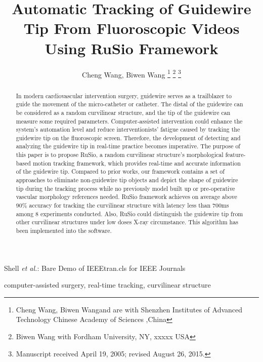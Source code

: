 \documentclass[journal]{IEEEtran}
\begin{document}
\title{Automatic Tracking of Guidewire Tip From Fluoroscopic Videos Using RuSio Framework}


\author{Cheng Wang, Biwen Wang
\thanks{Cheng Wang, Biwen Wangand are with Shenzhen Institutes of Advanced Technology Chinese Academy of Sciences ,China}
\thanks{Biwen Wang with Fordham University, NY, xxxxx USA}
\thanks{Manuscript received April 19, 2005; revised August 26, 2015.}}


{Shell \MakeLowercase{\textit{et al.}}: Bare Demo of IEEEtran.cls for IEEE Journals}


\maketitle


\begin{abstract}
In modern cardiovascular intervention surgery, guidewire serves as a trailblazer to guide the movement of the micro-catheter or catheter. The distal of the guidewire can be considered as a random curvilinear structure, and the tip of the guidewire can measure some required parameters. Computer-assisted intervention could enhance the system's automation level and reduce interventionists' fatigue caused by tracking the guidewire tip on the fluoroscopic screen. Therefore, the development of detecting and analyzing the guidewire tip in real-time practice becomes imperative. The purpose of this paper is to propose RuSio, a random curvilinear structure's morphological feature-based motion tracking framework, which provides real-time and accurate information of the guidewire tip. Compared to prior works, our framework contains a set of approaches to eliminate non-guidewire tip objects and depict the shape of guidewire tip during the tracking process while no previously model built up or pre-operative vascular morphology references needed. RuSio framework achieves on average above 90\% accuracy for tracking the curvilinear structure with latency less than 700ms among 8 experiments conducted. Also, RuSio could distinguish the guidewire tip from other curvilinear structures under low doses X-ray circumstance. This algorithm has been implemented into the software.
\end{abstract}


\begin{IEEEkeywords}
computer-assisted surgery, real-time tracking, curvilinear structure
\end{IEEEkeywords}
\end{document}
